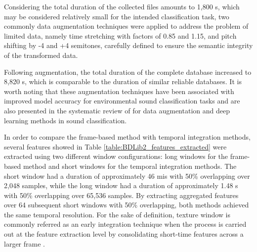 Considering the total duration of the collected files amounts to 1,800 \gls{s}, which may be considered relatively small for the intended classification task, two commonly data augmentation techniques were applied to address the problem of limited data, namely time stretching with factors of 0.85 and 1.15, and pitch shifting by -4 and +4 semitones, carefully defined to ensure the semantic integrity of the transformed data. 

Following augmentation, the total duration of the complete database increased to 8,820 \gls{s}, which is comparable to the duration of similar reliable databases. It is worth noting that these augmentation techniques have been associated with improved model accuracy for environmental sound classification tasks \cite{Salamon2017} and are also presented in the systematic review of \textcite{Alli2022} for data augmentation and deep learning methods in sound classification.

In order to compare the frame-based method with temporal integration methods, several features showed in Table \ref{table:BDLib2_features_extracted} were extracted using two different window configurations: long windows for the frame-based method and short windows for the temporal integration methods. The short window had a duration of approximately 46 \gls{mi}\gls{s} with 50\% overlapping over 2,048 samples, while the long window had a duration of approximately 1.48 \gls{s} with 50\% overlapping over 65,536 samples. By extracting aggregated features over 64 subsequent short windows with 50\% overlapping, both methods achieved the same temporal resolution. For the sake of definition, 
texture window is commonly referred as an early integration technique when the process is carried out at the feature extraction level by consolidating short-time features across a larger frame \cite{Bountourakis2019}.

